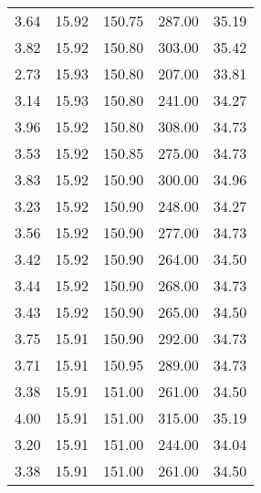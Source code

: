 \begin{table}
\begin{tabular}{S S S S S }
3.64  & 15.92  & 150.75  & 287.00  & 35.19\\ 
3.82  & 15.92  & 150.80  & 303.00  & 35.42\\ 
2.73  & 15.93  & 150.80  & 207.00  & 33.81\\ 
3.14  & 15.93  & 150.80  & 241.00  & 34.27\\ 
3.96  & 15.92  & 150.80  & 308.00  & 34.73\\ 
3.53  & 15.92  & 150.85  & 275.00  & 34.73\\ 
3.83  & 15.92  & 150.90  & 300.00  & 34.96\\ 
3.23  & 15.92  & 150.90  & 248.00  & 34.27\\ 
3.56  & 15.92  & 150.90  & 277.00  & 34.73\\ 
3.42  & 15.92  & 150.90  & 264.00  & 34.50\\ 
3.44  & 15.92  & 150.90  & 268.00  & 34.73\\ 
3.43  & 15.92  & 150.90  & 265.00  & 34.50\\ 
3.75  & 15.91  & 150.90  & 292.00  & 34.73\\ 
3.71  & 15.91  & 150.95  & 289.00  & 34.73\\ 
3.38  & 15.91  & 151.00  & 261.00  & 34.50\\ 
4.00  & 15.91  & 151.00  & 315.00  & 35.19\\ 
3.20  & 15.91  & 151.00  & 244.00  & 34.04\\ 
3.38  & 15.91  & 151.00  & 261.00  & 34.50\\ 
\bottomrule 
\end{tabular} 
\end{table}
